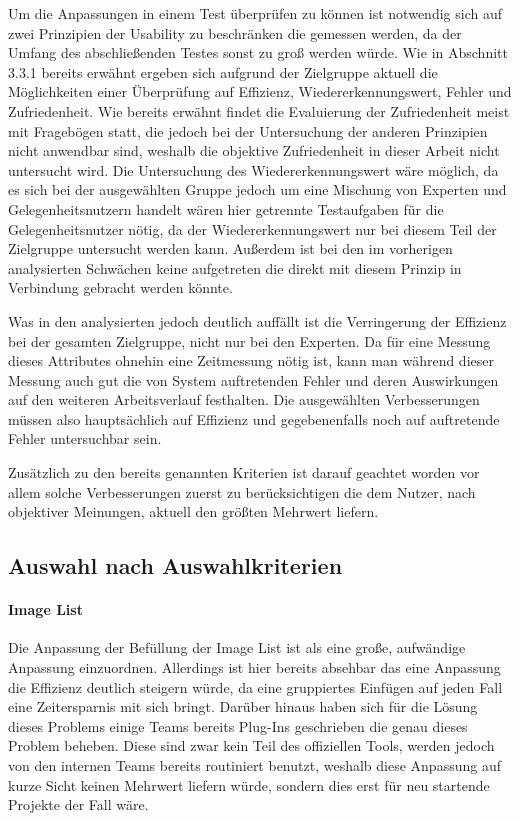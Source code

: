 Um die Anpassungen in einem Test überprüfen zu können ist notwendig sich auf zwei Prinzipien der Usability zu beschränken die gemessen werden, da der Umfang des abschließenden Testes sonst zu groß werden würde. Wie in Abschnitt 3.3.1 bereits erwähnt ergeben sich aufgrund der Zielgruppe aktuell die Möglichkeiten einer Überprüfung auf Effizienz, Wiedererkennungswert, Fehler und Zufriedenheit.
Wie bereits erwähnt findet die Evaluierung der Zufriedenheit meist mit Fragebögen statt, die jedoch bei der Untersuchung der anderen Prinzipien nicht anwendbar sind, weshalb die objektive Zufriedenheit in dieser Arbeit nicht untersucht wird.
Die Untersuchung des Wiedererkennungswert wäre möglich, da es sich bei der ausgewählten Gruppe jedoch um eine Mischung von Experten und Gelegenheitsnutzern handelt wären hier getrennte Testaufgaben für die Gelegenheitsnutzer nötig, da der Wiedererkennungswert nur bei diesem Teil der Zielgruppe untersucht werden kann.
Außerdem ist bei den im vorherigen analysierten Schwächen keine aufgetreten die direkt mit diesem Prinzip in Verbindung gebracht werden könnte.

Was in den analysierten jedoch deutlich auffällt ist die Verringerung der Effizienz bei der gesamten Zielgruppe, nicht nur bei den Experten.
Da für eine Messung dieses Attributes ohnehin eine Zeitmessung nötig ist, kann man während dieser Messung auch gut die von System auftretenden Fehler und deren Auswirkungen auf den weiteren Arbeitsverlauf festhalten.
Die ausgewählten Verbesserungen müssen also hauptsächlich auf Effizienz und gegebenenfalls noch auf auftretende Fehler untersuchbar sein.

Zusätzlich zu den bereits genannten Kriterien ist darauf geachtet worden vor allem solche Verbesserungen zuerst zu berücksichtigen die dem Nutzer, nach objektiver Meinungen, aktuell den größten Mehrwert liefern.

\subsection{Auswahl nach Auswahlkriterien}

\paragraph{Image List}
Die Anpassung der Befüllung der Image List ist als eine große, aufwändige Anpassung einzuordnen.
Allerdings ist hier bereits absehbar das eine Anpassung die Effizienz deutlich steigern würde, da eine gruppiertes Einfügen auf jeden Fall eine Zeitersparnis mit sich bringt.
Darüber hinaus haben sich für die Lösung dieses Problems einige Teams bereits Plug-Ins geschrieben die genau dieses Problem beheben. 
Diese sind zwar kein Teil des offiziellen Tools, werden jedoch von den internen Teams bereits routiniert benutzt, weshalb diese Anpassung auf kurze Sicht keinen Mehrwert liefern würde, sondern dies erst für neu startende Projekte der Fall wäre.


